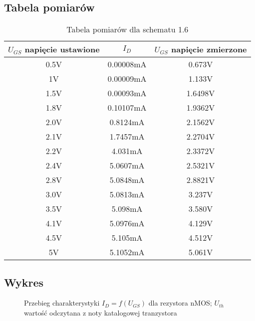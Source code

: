 \documentclass[polish,a4paper]{article}
\begin{document}
\subsection{Tabela pomiarów}
\begin{table}[H]
\centering
\begin{tabular}{|c|c|c|}
\hline
$U_{GS}$ napięcie ustawione & $I_{D}  $ & $U_{GS}$ napięcie zmierzone \\
\hline 
0.5V & 0.00008mA &0.673V \\
\hline
1V & 0.00009mA & 1.133V \\
\hline
1.5V & 0.00093mA & 1.6498V\\
\hline
1.8V & 0.10107mA & 1.9362V\\
\hline
2.0V & 0.8124mA & 2.1562V\\
\hline
2.1V & 1.7457mA & 2.2704V\\
\hline
2.2V & 4.031mA & 2.3372V\\
\hline
2.4V & 5.0607mA & 2.5321V\\
\hline
2.8V & 5.0848mA & 2.8821V\\
\hline
3.0V & 5.0813mA & 3.237V\\
\hline
3.5V & 5.098mA & 3.580V\\
\hline
4.1V & 5.0976mA & 4.129V\\
\hline
4.5V & 5.105mA & 4.512V\\
\hline
5V & 5.1052mA & 5.061V\\
\hline

\end{tabular}
\caption{Tabela pomiarów dla schematu 1.6}
\end{table}

\subsection{Wykres}


\begin{figure}[H]
\centering
{}
\caption{Przebieg charakterystyki $I_{D}=f(U_{GS})$ dla rezystora nMOS; $U_{th}$ wartość odczytana z noty katalogowej tranzystora}
\end{figure}
\end{document}
